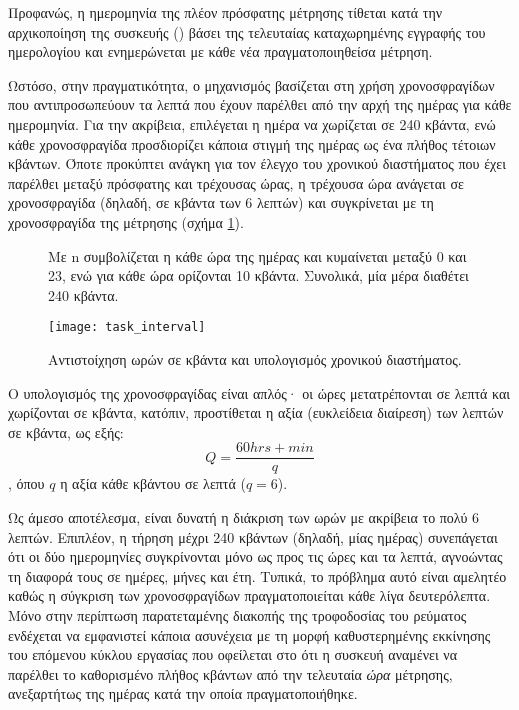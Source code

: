 Προφανώς, η ημερομηνία της πλέον πρόσφατης μέτρησης τίθεται κατά την
αρχικοποίηση της συσκευής () βάσει της τελευταίας καταχωρημένης
εγγραφής του ημερολογίου και ενημερώνεται με κάθε νέα πραγματοποιηθείσα μέτρηση.

Ωστόσο, στην πραγματικότητα, ο μηχανισμός βασίζεται στη χρήση χρονοσφραγίδων που
αντιπροσωπεύουν τα λεπτά που έχουν παρέλθει από την αρχή της ημέρας για κάθε
ημερομηνία. Για την ακρίβεια, επιλέγεται η ημέρα να χωρίζεται σε 240 κβάντα, ενώ
κάθε χρονοσφραγίδα προσδιορίζει κάποια στιγμή της ημέρας ως ένα πλήθος τέτοιων
κβάντων. Όποτε προκύπτει ανάγκη για τον έλεγχο του χρονικού διαστήματος που έχει
παρέλθει μεταξύ πρόσφατης και τρέχουσας ώρας, η τρέχουσα ώρα ανάγεται σε
χρονοσφραγίδα (δηλαδή, σε κβάντα των 6 λεπτών) και συγκρίνεται με τη
χρονοσφραγίδα της μέτρησης (σχήμα \ref{fig:task:interval}).

\begin{figure}
    \caption{Αντιστοίχηση ωρών σε κβάντα και υπολογισμός χρονικού διαστήματος.
    \label{fig:task:interval}}
    Με n συμβολίζεται η κάθε ώρα της ημέρας και κυμαίνεται μεταξύ 0 και 23, ενώ
    για κάθε ώρα ορίζονται 10 κβάντα. Συνολικά, μία μέρα διαθέτει 240 κβάντα.
    \begin{center}
    \texttt{[image: task\_interval]}
    \end{center}
\end{figure}

Ο υπολογισμός της χρονοσφραγίδας είναι απλός· οι ώρες μετατρέπονται σε λεπτά και
χωρίζονται σε κβάντα, κατόπιν, προστίθεται η αξία (ευκλείδεια διαίρεση) των
λεπτών σε κβάντα, ως εξής:
\begin{equation}
Q = \frac{60 hrs + min}{q}
\end{equation}
, όπου $q$ η αξία κάθε κβάντου σε λεπτά ($q = 6$).

Ως άμεσο αποτέλεσμα, είναι δυνατή η διάκριση των ωρών με ακρίβεια το πολύ 6
λεπτών. Επιπλέον, η τήρηση μέχρι 240 κβάντων (δηλαδή, μίας ημέρας) συνεπάγεται
ότι οι δύο ημερομηνίες συγκρίνονται μόνο ως προς τις ώρες και τα λεπτά,
αγνοώντας τη διαφορά τους σε ημέρες, μήνες και έτη. Τυπικά, το πρόβλημα αυτό
είναι αμελητέο καθώς η σύγκριση των χρονοσφραγίδων πραγματοποιείται κάθε λίγα
δευτερόλεπτα. Μόνο στην περίπτωση παρατεταμένης διακοπής της τροφοδοσίας του
ρεύματος ενδέχεται να εμφανιστεί κάποια ασυνέχεια με τη μορφή καθυστερημένης
εκκίνησης του επόμενου κύκλου εργασίας που οφείλεται στο ότι η συσκευή αναμένει
να παρέλθει το καθορισμένο πλήθος κβάντων από την τελευταία \emph{ώρα} μέτρησης,
ανεξαρτήτως της ημέρας κατά την οποία πραγματοποιήθηκε.


